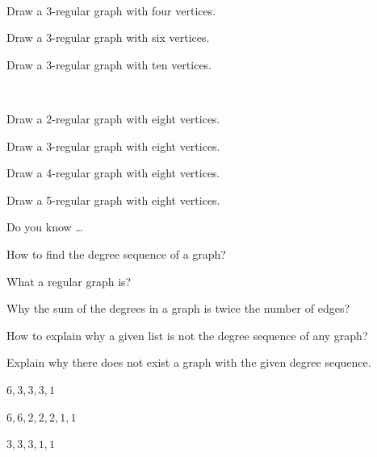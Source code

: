 \begin{exer}[\exerU] %
\label{exer_draw_regular_graph}
~
    \begin{exerpart}
        \item Draw a 3-regular graph with four vertices.
        \item Draw a 3-regular graph with six vertices.  
        \item Draw a 3-regular graph with ten vertices.
    \end{exerpart}
\end{exer}

\begin{exer}[\exerU] %
\label{exer_regular_graph_order8}
~
    \begin{exerpart}
        \item Draw a 2-regular graph with eight vertices.
        \item Draw a 3-regular graph with eight vertices.
        \item Draw a 4-regular graph with eight vertices.
        \item Draw a 5-regular graph with eight vertices.
    \end{exerpart}
\end{exer}

\begin{exer}[\exerR] %
\label{exer_dyk_deg_seq}
    Do you know \ldots
        \begin{exerpart}
            \item How to find the degree sequence of a graph?
            \item What a regular graph is?
            \item Why the sum of the degrees in a graph is twice the number of edges?
             \item How to explain why a given list is not the degree sequence of any graph?
        \end{exerpart}
\end{exer}

\begin{exer}[\exerE] %
\label{exer_show_not_graphical}
    Explain why there does not exist a graph with the given degree sequence.
        \begin{exerpart}
            \item $6,3,3,3,1$
            \item $6,6,2,2,2,1,1$  
            \item $3,3,3,1,1$
        \end{exerpart}
\end{exer}

